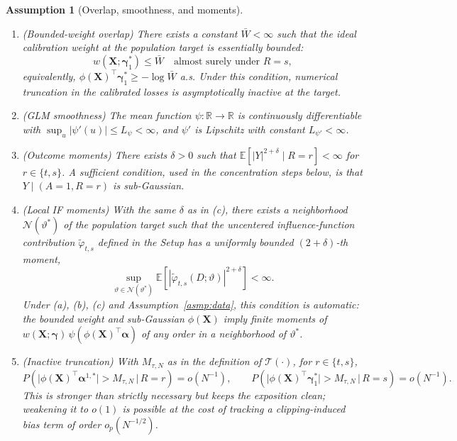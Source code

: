 \documentclass{article}
\newtheorem{assumption}{Assumption}[section]
\begin{document}
\begin{assumption}[Overlap, smoothness, and moments]\label{asmp:overlap}
\begin{enumerate}[label={(\alph*)},leftmargin=*]
    \item (Bounded-weight overlap) There exists a constant $\bar{W}<\infty$ such that the ideal calibration weight at the population target is essentially bounded:
    \[
    w(\boldsymbol{X};\boldsymbol{\gamma}_1^*)\le \bar{W}\quad\text{almost surely under }R=s,
    \]
    equivalently, $\phi(\boldsymbol{X})^\top\boldsymbol{\gamma}_1^* \ge -\log \bar{W}$ a.s. Under this condition, numerical truncation in the calibrated losses is asymptotically inactive at the target.

    \item (GLM smoothness) The mean function $\psi:\mathbb{R}\to\mathbb{R}$ is continuously differentiable with $\sup_u|\psi'(u)|\le L_\psi<\infty$, and $\psi'$ is Lipschitz with constant $L_{\psi'}<\infty$.

    \item (Outcome moments) There exists $\delta>0$ such that $\mathbb{E}[|Y|^{2+\delta}\mid R=r]<\infty$ for $r\in\{t,s\}$. A sufficient condition, used in the concentration steps below, is that $Y\mid(A=1,R=r)$ is sub-Gaussian.

    \item (Local IF moments) With the same $\delta$ as in (c), there exists a neighborhood $\mathcal{N}(\vartheta^*)$ of the population target such that the uncentered influence-function contribution $\widetilde{\varphi}_{t,s}$ defined in the Setup has a uniformly bounded $(2+\delta)$-th moment,
    \[
    \sup_{\vartheta\in\mathcal{N}(\vartheta^*)}\mathbb{E}\!\left[|\widetilde{\varphi}_{t,s}(D;\vartheta)|^{2+\delta}\right]<\infty.
    \]
    Under (a), (b), (c) and Assumption~\ref{asmp:data}, this condition is automatic: the bounded weight and sub-Gaussian $\phi(\boldsymbol{X})$ imply finite moments of $w(\boldsymbol{X};\boldsymbol{\gamma})\,\psi(\phi(\boldsymbol{X})^\top\boldsymbol{\alpha})$ of any order in a neighborhood of $\vartheta^*$.

    \item (Inactive truncation) With $M_{\tau,N}$ as in the definition of $\mathcal{T}(\cdot)$, for $r\in\{t,s\}$,
    \[
    P\!\left(\bigl|\phi(\boldsymbol{X})^\top\boldsymbol{\alpha}^{1,*}\bigr| > M_{\tau,N}\,\Big|\, R=r\right)=o(N^{-1}),\qquad
    P\!\left(\bigl|\phi(\boldsymbol{X})^\top\boldsymbol{\gamma}_1^*\bigr| > M_{\tau,N}\,\Big|\, R=s\right)=o(N^{-1}).
    \]
    This is stronger than strictly necessary but keeps the exposition clean; weakening it to $o(1)$ is possible at the cost of tracking a clipping-induced bias term of order $o_p(N^{-1/2})$.
\end{enumerate}
\end{assumption}
\end{document}
